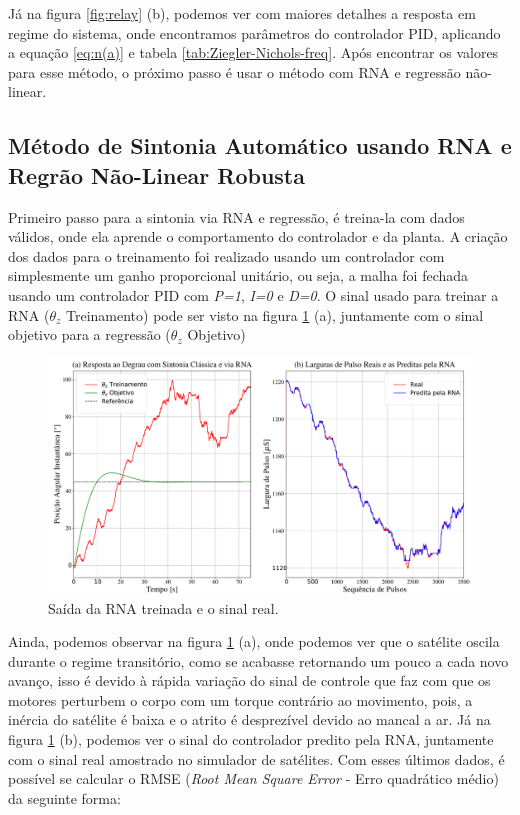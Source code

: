 Já na figura \ref{fig:relay} (b), podemos ver com maiores detalhes a resposta em regime do sistema, onde encontramos parâmetros do controlador PID, aplicando a equação \ref{eq:n(a)} e tabela \ref{tab:Ziegler-Nichols-freq}. Após encontrar os valores para esse método, o próximo passo é usar o método com RNA e regressão não-linear.



\subsection{Método de Sintonia Automático usando RNA e Regrão Não-Linear Robusta}

Primeiro passo para a sintonia via RNA e regressão, é treina-la com dados válidos, onde ela aprende o comportamento do controlador e da planta. A criação dos dados para o treinamento foi realizado usando um controlador com simplesmente um ganho proporcional unitário, ou seja, a malha foi fechada usando um controlador PID com \textit{P=1}, \textit{I=0} e \textit{D=0}. O sinal usado para treinar a RNA ($\theta_z$ Treinamento) pode ser visto na figura \ref{fig:neural_output} (a), juntamente com o sinal objetivo para a regressão ($\theta_z$ Objetivo)

\begin{figure}[H]
  \caption{Saída da RNA treinada e o sinal real.}
  \begin{center}
      \includegraphics[width=\textwidth]{resultados/img/neural_output}
  \end{center}
  \label{fig:neural_output}
\end{figure}

Ainda, podemos observar na figura \ref{fig:neural_output} (a), onde podemos ver que o satélite oscila durante o regime transitório, como se acabasse retornando um pouco a cada novo avanço, isso é devido à rápida variação do sinal de controle que faz com que os motores perturbem o corpo com um torque contrário ao movimento, pois, a inércia do satélite é baixa e o atrito é desprezível devido ao mancal a ar. Já na figura \ref{fig:neural_output} (b), podemos ver o sinal do controlador predito pela RNA, juntamente com o sinal real amostrado no simulador de satélites. Com esses últimos dados, é possível se calcular o RMSE (\textit{Root Mean Square Error} - Erro quadrático médio) da seguinte forma:


